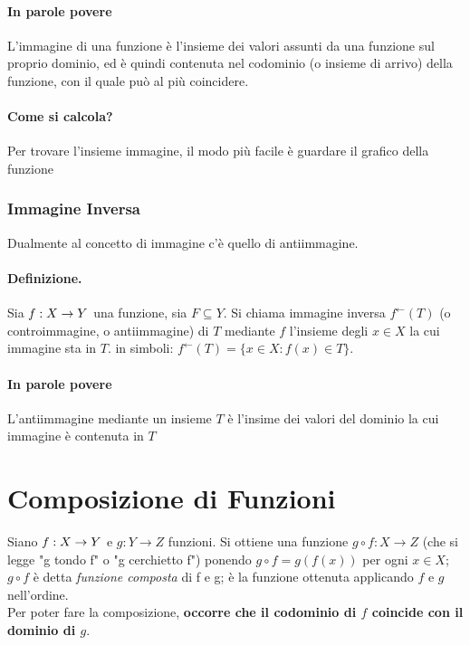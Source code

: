 \documentclass[12pt, a4paper, openany]{book}
\begin{document}
\paragraph{In parole povere}
L'immagine di una funzione è l'insieme dei valori assunti da una funzione sul proprio dominio,
ed è quindi contenuta nel codominio (o insieme di arrivo) della funzione, con il quale può al più coincidere.
\paragraph{Come si calcola?}
Per trovare l'insieme immagine, il modo più facile è guardare il grafico della funzione

\subsubsection{Immagine Inversa}
Dualmente al concetto di immagine c'è quello di antiimmagine.
\paragraph{Definizione. }Sia $f: X \rightarrow Y $ una funzione, sia $F \subseteq Y$.
Si chiama immagine inversa $f^\leftarrow(T)$ (o controimmagine, o antiimmagine) di $T$ mediante $f$ l'insieme degli $x \in X$ la cui immagine sta in $T$.
in simboli: $f^\leftarrow(T) = \{ x \in X : f(x) \in T\}$.
\paragraph{In parole povere} L'antiimmagine mediante un insieme $T$ è l'insime dei valori del dominio la cui immagine è contenuta in $T$


\section{Composizione di Funzioni}
Siano $f: X \rightarrow Y$ e $g: Y \rightarrow Z$ funzioni.
Si ottiene una funzione $g \circ f : X \rightarrow Z $ (che si legge "g tondo f" o "g cerchietto f") ponendo $g \circ f = g(f(x))$ per ogni $x \in X$;
$g \circ f$ è detta \emph{funzione composta} di f e g; è la funzione ottenuta applicando $f$ e $g$ nell'ordine.
\\Per poter fare la composizione, \textbf{occorre che il codominio di $f$ coincide con il dominio di $g$}.


\end{document}
